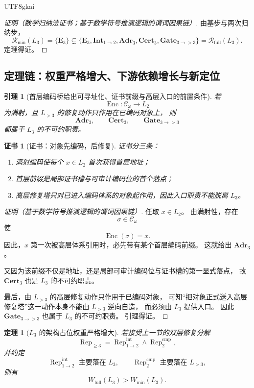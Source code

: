 \documentclass[12pt]{article}
\newtheorem{theorem}{定理}[section]
\newtheorem{lemma}{引理}[section]
\newtheorem{Certificate}{证书}[section]
\begin{document}
\begin{CJK*}{UTF8}{gkai}
\begin{proof}[证明（数学归纳法证书；基于数学符号推演逻辑的谓词因果链）]
由基步与两次归纳步，
\[
  \mathcal R_{\mathrm{min}}(L_3)=\{\mathbf E_3\}
  \subsetneq
  \{\mathbf E_3,\mathbf{Int}_{1\to2},\mathbf{Adr}_3,\mathbf{Cert}_3,\mathbf{Gate}_{3\to >3}\}
  =
  \mathcal R_{\mathrm{full}}(L_3).
\]
定理得证。
\end{proof}

\subsection{定理链：权重严格增大、下游依赖增长与新定位}
\label{subsec:tex1-ch12-theorems}

\begin{lemma}[首层编码桥给出可寻址化、证书前缀与高层入口的前置条件]
\label{lem:tex1-ch12-entry}
若
\[
  \operatorname{Enc}:\mathcal C_\omega\to L_2
\]
为满射，且 \(L_{>3}\) 的修复动作只作用在已编码对象上，
则
\[
  \mathbf{Adr}_3,\qquad \mathbf{Cert}_3,\qquad \mathbf{Gate}_{3\to >3}
\]
都属于 \(L_3\) 的不可约职责。
\end{lemma}

\begin{Certificate}[证书：对象先编码，后修复]
\label{cert:tex1-ch12-entry}
证书分三条：
\begin{enumerate}
  \item 满射编码使每个 \(x\in L_2\) 首次获得首层地址；
  \item 首层前缀是局部证书槽与可审计编码位的首个落点；
  \item 高层修复塔只对已进入编码体系的对象起作用，因此入口职责不能脱离 \(L_3\)。
\end{enumerate}
\end{Certificate}

\begin{proof}[证明（基于数学符号推演逻辑的谓词因果链）]
任取 \(x\in L_2\)。
由满射性，存在
\[
  \sigma\in\mathcal C_\omega
\]
使
\[
  \operatorname{Enc}(\sigma)=x.
\]
因此，\(x\) 第一次被高层体系引用时，必先带有某个首层编码前缀。
这就给出 \(\mathbf{Adr}_3\)。

又因为该前缀不仅是地址，还是局部可审计编码位与证书槽的第一显式落点，
故 \(\mathbf{Cert}_3\) 也是 \(L_3\) 的不可约职责。

最后，由 \(L_{>3}\) 的高层修复动作只作用于已编码对象，
可知“把对象正式送入高层修复塔”这一动作本身不能由 \(L_{>3}\) 逆向自造，
而必须由 \(L_3\) 提供入口。
因此 \(\mathbf{Gate}_{3\to >3}\) 也属于 \(L_3\) 的不可约职责。
引理得证。
\end{proof}

\begin{theorem}[\(L_3\) 的架构占位权重严格增大]
\label{thm:tex1-ch12-weight}
若接受上一节的双层修复分解
\[
  \operatorname{Rep}_{\ge3}
  =
  \operatorname{Rep}^{\mathrm{int}}_{1\to2}
  \wedge
  \operatorname{Rep}^{\mathrm{cmp}}_{2},
\]
并约定
\[
  \operatorname{Rep}^{\mathrm{int}}_{1\to2}\text{ 主要落在 }L_3,
  \qquad
  \operatorname{Rep}^{\mathrm{cmp}}_{2}\text{ 主要落在 }L_{>3},
\]
则有
\[
  \boxed{
    W_{\mathrm{full}}(L_3)>W_{\mathrm{min}}(L_3).
  }
\]
\end{theorem}


\end{CJK*}
\end{document}
